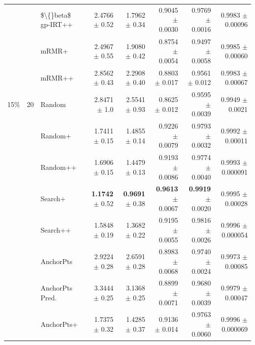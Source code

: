 \begin{longtable}{llp{}rrrrr}
 &  & \$\textbackslash\{\}beta\$ gp-IRT++ & 2.4766 {\scriptsize $\pm$ 0.52} & 1.7962 {\scriptsize $\pm$ 0.34} & 0.9045 {\scriptsize $\pm$ 0.0030} & 0.9769 {\scriptsize $\pm$ 0.0016} & 0.9983 {\scriptsize $\pm$ 0.00096} \\
 &  & mRMR+ & 2.4967 {\scriptsize $\pm$ 0.55} & 1.9080 {\scriptsize $\pm$ 0.42} & 0.8754 {\scriptsize $\pm$ 0.0054} & 0.9497 {\scriptsize $\pm$ 0.0058} & 0.9985 {\scriptsize $\pm$ 0.00060} \\
 &  & mRMR++ & 2.8562 {\scriptsize $\pm$ 0.43} & 2.2908 {\scriptsize $\pm$ 0.40} & 0.8803 {\scriptsize $\pm$ 0.017} & 0.9561 {\scriptsize $\pm$ 0.012} & 0.9983 {\scriptsize $\pm$ 0.00067} \\
\midrule
15\% & 20 & Random & 2.8471 {\scriptsize $\pm$ 1.0} & 2.5541 {\scriptsize $\pm$ 0.93} & 0.8625 {\scriptsize $\pm$ 0.012} & 0.9595 {\scriptsize $\pm$ 0.0039} & 0.9949 {\scriptsize $\pm$ 0.0021} \\
 &  & Random+ & 1.7411 {\scriptsize $\pm$ 0.15} & 1.4855 {\scriptsize $\pm$ 0.14} & 0.9226 {\scriptsize $\pm$ 0.0079} & 0.9793 {\scriptsize $\pm$ 0.0032} & 0.9992 {\scriptsize $\pm$ 0.00011} \\
 &  & Random++ & 1.6906 {\scriptsize $\pm$ 0.15} & 1.4479 {\scriptsize $\pm$ 0.13} & 0.9193 {\scriptsize $\pm$ 0.0086} & 0.9774 {\scriptsize $\pm$ 0.0040} & 0.9993 {\scriptsize $\pm$ 0.000091} \\
 &  & Search+ & \textbf{1.1742} {\scriptsize $\pm$ 0.52} & \textbf{0.9691} {\scriptsize $\pm$ 0.38} & \textbf{0.9613} {\scriptsize $\pm$ 0.0067} & \textbf{0.9919} {\scriptsize $\pm$ 0.0020} & 0.9995 {\scriptsize $\pm$ 0.00028} \\
 &  & Search++ & 1.5848 {\scriptsize $\pm$ 0.19} & 1.3682 {\scriptsize $\pm$ 0.22} & 0.9195 {\scriptsize $\pm$ 0.0055} & 0.9816 {\scriptsize $\pm$ 0.0026} & 0.9996 {\scriptsize $\pm$ 0.000054} \\
 &  & AnchorPts & 2.9224 {\scriptsize $\pm$ 0.28} & 2.6591 {\scriptsize $\pm$ 0.28} & 0.8983 {\scriptsize $\pm$ 0.0068} & 0.9740 {\scriptsize $\pm$ 0.0024} & 0.9973 {\scriptsize $\pm$ 0.00085} \\
 &  & AnchorPts Pred. & 3.3444 {\scriptsize $\pm$ 0.25} & 3.1368 {\scriptsize $\pm$ 0.25} & 0.8899 {\scriptsize $\pm$ 0.0071} & 0.9680 {\scriptsize $\pm$ 0.0039} & 0.9979 {\scriptsize $\pm$ 0.00047} \\
 &  & AnchorPts+ & 1.7375 {\scriptsize $\pm$ 0.32} & 1.4285 {\scriptsize $\pm$ 0.37} & 0.9136 {\scriptsize $\pm$ 0.014} & 0.9763 {\scriptsize $\pm$ 0.0060} & 0.9996 {\scriptsize $\pm$ 0.000069} \\

\end{longtable}
